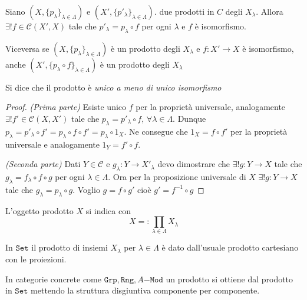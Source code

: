 \begin{proposition}{}
    Siano \({(X, \{p_\lambda\}_{\lambda \in \Lambda} )}\) e \({(X', \{p'_{\lambda} \}_{\lambda \in \Lambda} )}\).
    due prodotti in \(C\) degli \(X_{\lambda} \). Allora \(\exists ! f \in \mathcal{C}{(X', X)}\) 
    tale che \(p'_\lambda = p_\lambda \circ f\) per ogni \(\lambda\) e \(f\) è
    isomorfismo. 

    Viceversa se \({(X, \{p_\lambda\}_{\lambda \in \Lambda} )}\) è un prodotto
    degli \(X_\lambda\) e \(f : X' \to X\) è isomorfismo, anche \({(X', \{p_\lambda \circ f\}_{\lambda \in \Lambda} )}\) è un prodotto degli \(X_\lambda\) 
\end{proposition}
\begin{remark}{}
    Si dice che il prodotto è \emph{unico a meno di unico isomorfismo}
\end{remark}
\begin{proof}
    \emph{(Prima parte)}
    Esiste unico \(f\) per la proprietà universale, analogamente \(\exists ! f'
    \in \mathcal{C}{(X, X')}\) tale che \(p_\lambda = p'_\lambda \circ f\), \(\forall \lambda \in \Lambda\). Dunque \(p_\lambda = p'_\lambda \circ f' = p_\lambda \circ f \circ f' = p_\lambda
     \circ 1_X\). Ne consegue che \(1_X = f \circ f'\) per la proprietà
     universale e analogamente \(1_Y = f'\circ f\).

     \emph{(Seconda parte)} Dati \(Y \in \mathcal{C}\) e \(g_\lambda : Y \to
     X'_\lambda\) devo dimostrare che \(\exists ! g : Y \to X\) tale che \(
     g_\lambda = f_\lambda \circ f \circ g\) per ogni \(\lambda \in \Lambda\).
     Ora per la proposizione universale di \(X\) \(\exists ! g : Y \to X\) tale
     che \(g_\lambda = p_\lambda \circ g\). Voglio \(g = f \circ g'\) cioè \(g'
     = f^{-1} \circ g\) 
\end{proof}

\begin{note}[zione]
    L'oggetto prodotto \(X\) si indica con
    \[
      X =: \prod_{\lambda \in \Lambda} X_\lambda
    \]
\end{note}

\begin{example}{}
    In \(\mathtt{Set}\) il prodotto di insiemi \(X_\lambda\) per \(\lambda \in \Lambda\) 
    è dato dall'usuale prodotto cartesiano con le proiezioni.

    In categorie concrete come \(\mathtt{Grp}, \mathtt{Rng}, A\mathtt{-Mod}\) un
    prodotto si ottiene dal prodotto in \(\mathtt{Set}\) mettendo la struttura
    disgiuntiva componente per componente.
\end{example}

